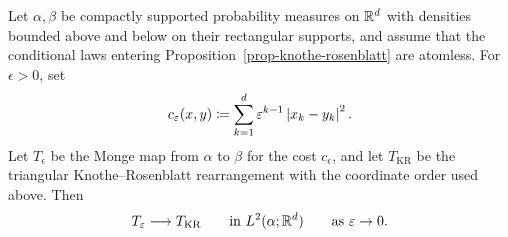 \begin{prop}\label{prop-knothe-limit-anisotropic-brenier}
	Let $\alpha,\beta$ be compactly supported probability measures on $\mathbb{R}^d$ with densities bounded above and below on their rectangular supports, and assume that the conditional laws entering Proposition~\ref{prop-knothe-rosenblatt} are atomless. For $\epsilon>0$, set
	\[
		c_\varepsilon(x,y)
		\coloneqq
		\sum_{k=1}^d \varepsilon^{k-1}\left\lvert x_k-y_k\right\rvert^2 .
	\]
	Let $T_\epsilon$ be the Monge map from $\alpha$ to $\beta$ for the cost $c_\epsilon$, and let $T_{\mathrm{KR}}$ be the triangular Knothe--Rosenblatt rearrangement with the coordinate order used above. Then
	\[
		T_\varepsilon \longrightarrow T_{\mathrm{KR}}
		\qquad\text{in } L^2(\alpha;\mathbb{R}^d)
		\qquad\text{as } \varepsilon\to0 .
	\]
\end{prop}


